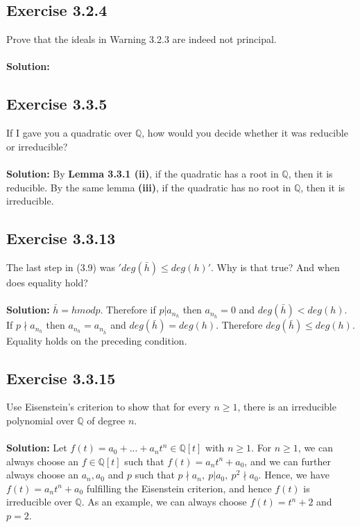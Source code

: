 \documentclass{article}
\begin{document}
\subsection*{Exercise 3.2.4}
Prove that the ideals in Warning 3.2.3 are indeed not
principal.
\\\\
\textbf{Solution:}

\subsection*{Exercise 3.3.5}
If I gave you a quadratic over $\mathbb{Q}$, how would you decide
whether it was reducible or irreducible?
\\\\
\textbf{Solution:}
By \textbf{Lemma 3.3.1 (ii)}, if the quadratic has a root in $\mathbb{Q}$, then it is reducible.
By the same lemma \textbf{(iii)}, if the quadratic has no root in $\mathbb{Q}$, then it is irreducible. 

\subsection*{Exercise 3.3.13}
The last step in (3.9) was $'deg(\bar h) \leq deg(h)'$. Why
is that true? And when does equality hold?
\\\\
\textbf{Solution:}
$\bar h = hmodp$. Therefore if $p|a_{n_h}$ then $a_{n_{\bar h}}=0$ and $deg(\bar h) < deg(h)$. If $p \nmid a_{n_h}$ then $a_{n_h} = a_{n_{\bar h}}$ and $deg(\bar h)= deg(h)$.
Therefore $deg(\bar h) \leq deg(h)$. Equality holds on the preceding condition.

\subsection*{Exercise 3.3.15}
Use Eisenstein's criterion to show that for every
$n \ge 1$, there is an irreducible polynomial over $\mathbb{Q}$ of degree $n$.
\\\\
\textbf{Solution:}
Let $f(t) = a_0 + ... + a_nt^n \in \mathbb{Q}[t]$ with $n \geq 1$.
For $n \geq 1$, we can always choose an $f \in \mathbb{Q}[t]$ such that $f(t)=a_nt^n + a_0$, and we can further
always choose an $a_n, a_0$ and $p$ such that $p \nmid a_n,\ p|a_0,\ p^2 \nmid a_0$. Hence, we have $f(t) = a_nt^n + a_0$ fulfilling the
Eisenstein criterion, and hence $f(t)$ is irreducible over $\mathbb{Q}$. As an example, we can always choose
$f(t) = t^n +2$ and $p=2$.
\end{document}
